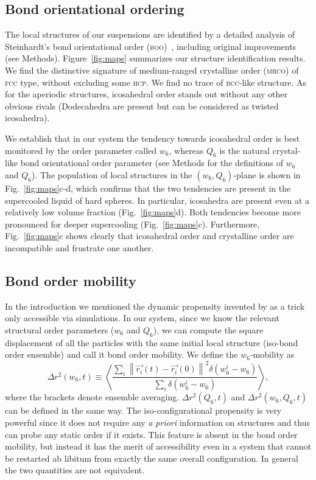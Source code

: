 \subsection*{Bond orientational ordering}

The local structures of our suspensions are identified by a detailed analysis of Steinhardt's bond orientational order (\textsc{boo})~\citep{steinhardt1983boo}, including original improvements (see Methods). Figure~\ref{fig:maps} summarizes our structure identification results. We find the distinctive signature of medium-ranged crystalline order (\textsc{mrco}) of \textsc{fcc} type, without excluding some \textsc{hcp}. We find no trace of \textsc{bcc}-like structure. As for the aperiodic structures, icosahedral order stands out without any other obvious rivals (Dodecahedra are present but can be considered as twisted icosahedra).


We establish that in our system the tendency towards icosahedral order is best monitored by the order parameter called $w_6$, whereas $Q_6$ is the natural crystal-like bond 
orientational order parameter (see Methods for the definitions of $w_6$ and $Q_6$). The population of local structures in the $(w_6,Q_6)$-plane is shown in Fig.~\ref{fig:maps}c-d, which confirms that the two tendencies are present in the supercooled liquid of hard spheres. In particular, icosahedra are present even at a relatively low volume fraction (Fig.~\ref{fig:maps}d). Both tendencies become more pronounced for deeper supercooling (Fig.~\ref{fig:maps}c). Furthermore, Fig.~\ref{fig:maps}c shows clearly that icosahedral order and crystalline order are incompatible and frustrate one another.


\subsection*{Bond order mobility}
In the introduction we mentioned the dynamic propensity invented by \citet{Widmer-Cooper2005} as a trick only accessible via simulations. In our system, since we know the relevant structural order parameters ($w_6$ and $Q_6$), we can compute the square displacement of all the particles with the same initial local structure (iso-bond order ensemble) and call it bond order mobility. We define the $w_6$-mobility as
\begin{equation}
	\Delta r^2(w_6, t) \equiv \left\langle \frac{
		\sum\limits_i{
			\left\|\vec{r_i}(t)-\vec{r_i}(0)\right\|^2 \delta(w_6^i-w_6)
			}
	}{
		\sum\limits_i{\delta(w_6^i-w_6)}
	}\right\rangle, 
	\label{eq:bo_propensity}
\end{equation}
where the brackets denote ensemble averaging. $\Delta r^2(Q_6, t)$ and $\Delta r^2(w_6, Q_6, t)$ can be defined in the same way. 
The iso-configurational propensity is very powerful since it does not require any {\it a priori} information on structures and thus can probe any static order if it exists. This feature is absent in the bond order mobility, but instead it has the merit of accessibility even in a system that cannot be restarted ab libitum from exactly the same overall configuration. In general the two quantities are not equivalent.

